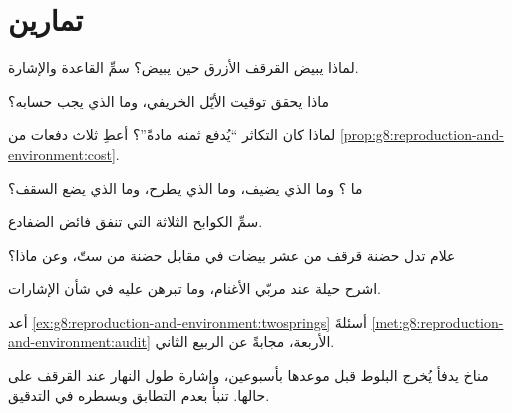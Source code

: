 \section{تمارين}

\begin{exercise}[$\star$]\label{exo:g8:reproduction-and-environment:1}
لماذا يبيض القرقف الأزرق حين يبيض؟ سمِّ القاعدة والإشارة.
\end{exercise}

\begin{exercise}[$\star$]\label{exo:g8:reproduction-and-environment:2}
ماذا يحقق توقيت الأيّل الخريفي، وما الذي يجب حسابه؟
\end{exercise}

\begin{exercise}[$\star$]\label{exo:g8:reproduction-and-environment:3}
لماذا كان التكاثر ``يُدفع ثمنه مادةً''؟ أعطِ ثلاث دفعات من
\cref{prop:g8:reproduction-and-environment:cost}.
\end{exercise}

\begin{exercise}[$\star$]\label{exo:g8:reproduction-and-environment:4}
ما ؟ وما الذي يضيف، وما الذي يطرح، وما الذي يضع السقف؟
\end{exercise}

\begin{exercise}[$\star$]\label{exo:g8:reproduction-and-environment:5}
سمِّ الكوابح الثلاثة التي تنفق فائض الضفادع.
\end{exercise}

\begin{exercise}[$\star$]\label{exo:g8:reproduction-and-environment:6}
علام تدل حضنة قرقف من عشر بيضات في مقابل حضنة من ستّ، وعن ماذا؟
\end{exercise}

\begin{exercise}[$\star\star$]\label{exo:g8:reproduction-and-environment:7}
اشرح حيلة  عند مربّي الأغنام، وما تبرهن عليه في شأن
الإشارات.
\end{exercise}

\begin{exercise}[$\star\star$]\label{exo:g8:reproduction-and-environment:8}
أعد \cref{ex:g8:reproduction-and-environment:twosprings} أسئلةَ
\cref{met:g8:reproduction-and-environment:audit} الأربعة، مجابةً
عن الربيع الثاني.
\end{exercise}

\begin{exercise}[$\star\star$]\label{exo:g8:reproduction-and-environment:9}
مناخ يدفأ يُخرج  البلوط قبل موعدها بأسبوعين، وإشارة طول
النهار عند القرقف على حالها. تنبأ بعدم التطابق وبسطره في التدقيق.
\end{exercise}

